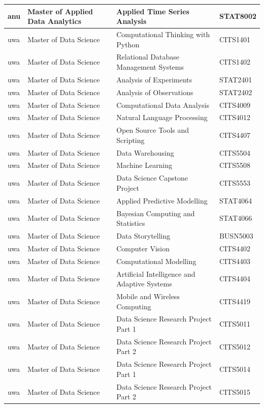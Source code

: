 \documentclass[
  letterpaper,
  DIV=11,
  numbers=noendperiod]{scrreport}
\begin{document}
\begin{table}
\begin{tabular}{l|l|l|l}
\hline
anu & Master of Applied Data Analytics & Applied Time Series Analysis & STAT8002\\
\hline
uwa & Master of Data Science & Computational Thinking with Python & CITS1401\\
\hline
uwa & Master of Data Science & Relational Database Management Systems & CITS1402\\
\hline
uwa & Master of Data Science & Analysis of Experiments & STAT2401\\
\hline
uwa & Master of Data Science & Analysis of Observations & STAT2402\\
\hline
uwa & Master of Data Science & Computational Data Analysis & CITS4009\\
\hline
uwa & Master of Data Science & Natural Language Processing & CITS4012\\
\hline
uwa & Master of Data Science & Open Source Tools and Scripting & CITS4407\\
\hline
uwa & Master of Data Science & Data Warehousing & CITS5504\\
\hline
uwa & Master of Data Science & Machine Learning & CITS5508\\
\hline
uwa & Master of Data Science & Data Science Capstone Project & CITS5553\\
\hline
uwa & Master of Data Science & Applied Predictive Modelling & STAT4064\\
\hline
uwa & Master of Data Science & Bayesian Computing and Statistics & STAT4066\\
\hline
uwa & Master of Data Science & Data Storytelling & BUSN5003\\
\hline
uwa & Master of Data Science & Computer Vision & CITS4402\\
\hline
uwa & Master of Data Science & Computational Modelling & CITS4403\\
\hline
uwa & Master of Data Science & Artificial Intelligence and Adaptive Systems & CITS4404\\
\hline
uwa & Master of Data Science & Mobile and Wireless Computing & CITS4419\\
\hline
uwa & Master of Data Science & Data Science Research Project Part 1 & CITS5011\\
\hline
uwa & Master of Data Science & Data Science Research Project Part 2 & CITS5012\\
\hline
uwa & Master of Data Science & Data Science Research Project Part 1 & CITS5014\\
\hline
uwa & Master of Data Science & Data Science Research Project Part 2 & CITS5015\\

\end{tabular}
\end{table}
\end{document}
